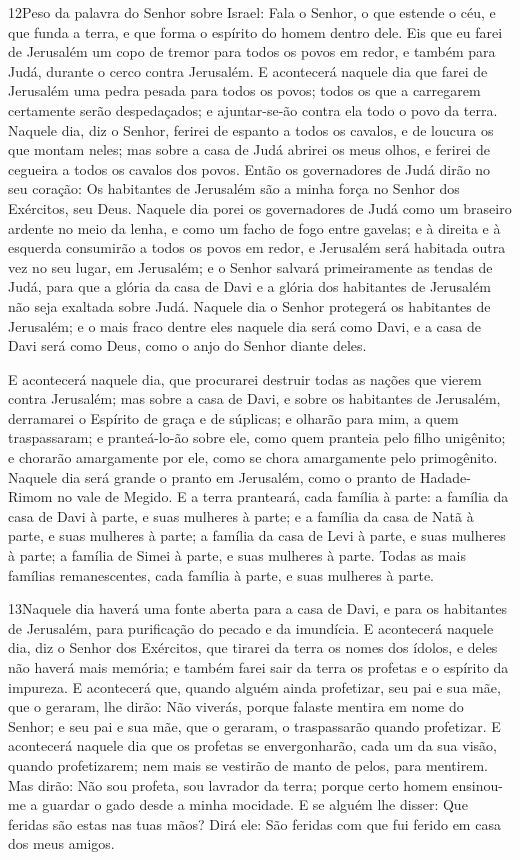 \lettrine{12} Peso da palavra do Senhor sobre Israel: Fala o
Senhor, o que estende o céu, e que funda a terra, e que forma o
espírito do homem dentro dele. Eis que eu farei de Jerusalém um
copo de tremor para todos os povos em redor, e também para Judá,
durante o cerco contra Jerusalém. E acontecerá naquele dia que
farei de Jerusalém uma pedra pesada para todos os povos; todos os
que a carregarem certamente serão despedaçados; e ajuntar-se-ão
contra ela todo o povo da terra. Naquele dia, diz o Senhor,
ferirei de espanto a todos os cavalos, e de loucura os que montam
neles; mas sobre a casa de Judá abrirei os meus olhos, e ferirei de
cegueira a todos os cavalos dos povos. Então os governadores de
Judá dirão no seu coração: Os habitantes de Jerusalém são a minha
força no Senhor dos Exércitos, seu Deus. Naquele dia porei os
governadores de Judá como um braseiro ardente no meio da lenha, e
como um facho de fogo entre gavelas; e à direita e à esquerda
consumirão a todos os povos em redor, e Jerusalém será habitada
outra vez no seu lugar, em Jerusalém; e o Senhor salvará
primeiramente as tendas de Judá, para que a glória da casa de Davi e
a glória dos habitantes de Jerusalém não seja exaltada sobre Judá.
Naquele dia o Senhor protegerá os habitantes de Jerusalém; e o
mais fraco dentre eles naquele dia será como Davi, e a casa de Davi
será como Deus, como o anjo do Senhor diante deles.

E acontecerá naquele dia, que procurarei destruir todas as nações
que vierem contra Jerusalém; mas sobre a casa de Davi, e
sobre os habitantes de Jerusalém, derramarei o Espírito de graça e
de súplicas; e olharão para mim, a quem traspassaram; e
pranteá-lo-ão sobre ele, como quem pranteia pelo filho unigênito; e
chorarão amargamente por ele, como se chora amargamente pelo
primogênito. Naquele dia será grande o pranto em Jerusalém,
como o pranto de Hadade-Rimom no vale de Megido. E a terra
pranteará, cada família à parte: a família da casa de Davi à parte,
e suas mulheres à parte; e a família da casa de Natã à parte, e suas
mulheres à parte; a família da casa de Levi à parte, e suas
mulheres à parte; a família de Simei à parte, e suas mulheres à
parte. Todas as mais famílias remanescentes, cada família à
parte, e suas mulheres à parte.

\medskip

\lettrine{13} Naquele dia haverá uma fonte aberta para a casa
de Davi, e para os habitantes de Jerusalém, para purificação do
pecado e da imundícia. E acontecerá naquele dia, diz o Senhor
dos Exércitos, que tirarei da terra os nomes dos ídolos, e deles não
haverá mais memória; e também farei sair da terra os profetas e o
espírito da impureza. E acontecerá que, quando alguém ainda
profetizar, seu pai e sua mãe, que o geraram, lhe dirão: Não
viverás, porque falaste mentira em nome do Senhor; e seu pai e sua
mãe, que o geraram, o traspassarão quando profetizar. E
acontecerá naquele dia que os profetas se envergonharão, cada um da
sua visão, quando profetizarem; nem mais se vestirão de manto de
pelos, para mentirem. Mas dirão: Não sou profeta, sou lavrador
da terra; porque certo homem ensinou-me a guardar o gado desde a
minha mocidade. E se alguém lhe disser: Que feridas são estas
nas tuas mãos? Dirá ele: São feridas com que fui ferido em casa dos
meus amigos.

